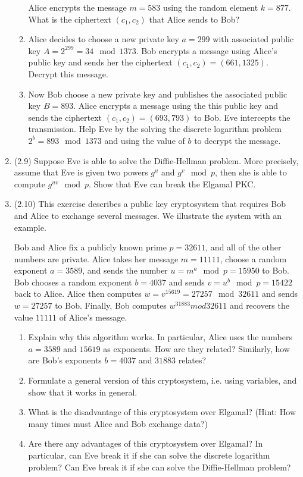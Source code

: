 \documentclass[12pt]{amsart}
\theoremstyle{definition}
\begin{document}
\begin{enumerate}
\begin{enumerate}
				Alice encrypts the message $m=583$ using the random 
				element $k=877$. What is the ciphertext $(c_1,c_2)$ 
				that Alice sends to Bob?
			\item Alice decides to choose a new private key $a=299$ with 
				associated public key $A = 2^{299} = 34 \mod 1373$. 
				Bob encrypts a message using Alice's public key and 
				sends her the ciphertext $(c_1,c_2) = (661,1325)$. 
				Decrypt this message. 
			\item Now Bob choose a new private key and publishes the 
				associated public key $B = 893$. Alice encrypts a 
				message using the this public key and sends the ciphertext 
				$(c_1,c_2) = (693,793)$ to Bob. Eve intercepts the 
				transmission. Help Eve by the solving the discrete 
				logarithm problem $2^b = 893 \mod 1373$ and using the 
				value of $b$ to decrypt the message. 
		\end{enumerate}
	\item (2.9) Suppose Eve is able to solve the Diffie-Hellman problem. More precisely, 
		assume that Eve is given two powers $g^u$ and $g^v \mod p$, then she is 
		able to compute $g^{uv} \mod p$. Show that Eve can break the Elgamal PKC.
	\item (2.10) This exercise describes a public key cryptosystem that requires Bob and 
		Alice to exchange several messages. We illustrate the system with an example. 

		Bob and Alice fix a publicly known prime $p=32611$, and all of the other 
		numbers are private. Alice takes her message $m=11111$, choose a random 
		exponent $a=3589$, and sends the number $u = m^a \mod p = 15950$ to Bob. Bob 
		chooses a random exponent $b=4037$ and sends $v = u^b \mod p = 15422$ back 
		to Alice. Alice then computes $w = v^{15619} = 27257 \mod 32611$ and sends 
		$w = 27257$ to Bob. Finally, Bob computes $w^{31883} mod 32611$ and recovers 
		the value $11111$ of Alice's message. 
		\begin{enumerate}
			\item Explain why this algorithm works. In particular, Alice uses the 
				numbers $a=3589$ and $15619$ as exponents. How are they related? 
				Similarly, how are Bob's exponents $b=4037$ and $31883$ relates? 
			\item Formulate a general version of this cryptosystem, i.e. using variables, 
				and show that it works in general. 
			\item What is the disadvantage of this cryptosystem over Elgamal? (Hint: 
				How many times must Alice and Bob exchange data?)
			\item Are there any advantages of this cryptosystem over Elgamal? In particular, 
				can Eve break it if she can solve the discrete logarithm problem? 
				Can Eve break it if she can solve the Diffie-Hellman problem?
		\end{enumerate}
\end{enumerate}
\end{document}
